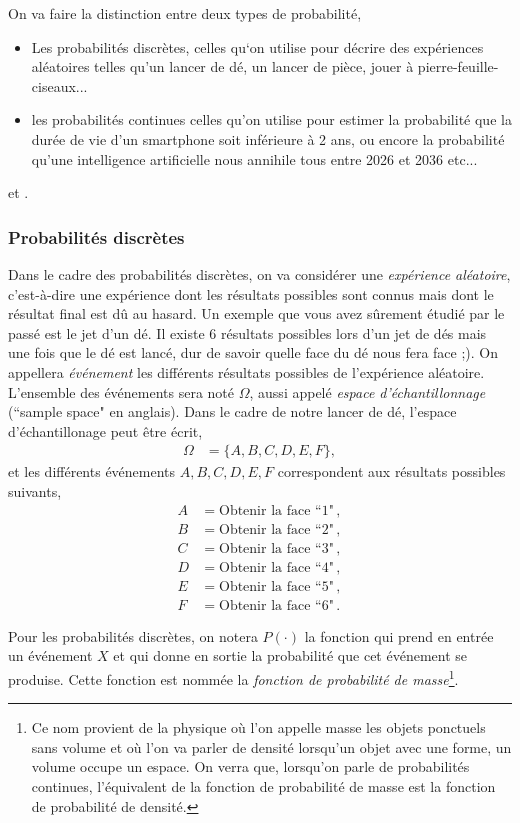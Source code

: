 \documentclass[titlepage]{article}
\theoremstyle{cleanremark}
\begin{document}
On va faire la distinction entre deux types de probabilité,
\begin{itemize}
    \item Les probabilités discrètes, celles qu`on utilise pour décrire des expériences aléatoires telles qu'un lancer de dé, un lancer de pièce, jouer à pierre-feuille-ciseaux...
    \item les probabilités continues celles qu'on utilise pour estimer la probabilité que la durée de vie d'un smartphone soit inférieure à 2 ans, ou encore la probabilité qu'une intelligence artificielle nous annihile tous entre 2026 et 2036 etc...
\end{itemize}  et . 




\subsubsection{Probabilités discrètes}
Dans le cadre des probabilités discrètes, on va considérer une \textit{expérience aléatoire}, c'est-à-dire une expérience dont les résultats possibles sont connus mais dont le résultat final est dû au hasard. Un exemple que vous avez sûrement étudié par le passé est le jet d'un dé. 
Il existe 6 résultats possibles lors d'un jet de dés mais une fois que le dé est lancé, dur de savoir quelle face du dé nous fera face ;).
On appellera \textit{événement} les différents résultats possibles de l'expérience aléatoire. L'ensemble des événements sera noté $\Omega$, aussi appelé \textit{espace d'échantillonnage} (``sample space" en anglais). Dans le cadre de notre lancer de dé, l'espace d'échantillonage peut être écrit,
\begin{align}
    \Omega &= \{A, B, C, D, E, F\},
\end{align}
et les différents événements $A,B,C,D,E,F$ correspondent aux résultats possibles suivants, 
\begin{align}
    A &= \text{Obtenir la face ``1"} \, ,
    \\
    B &= \text{Obtenir la face ``2"}\, ,
    \\
    C &= \text{Obtenir la face ``3"}\, ,
    \\
    D &= \text{Obtenir la face ``4"}\, ,
    \\
    E &= \text{Obtenir la face ``5"}\, ,
    \\
    F &= \text{Obtenir la face ``6"}\, .
\end{align}

Pour les probabilités discrètes, on notera $P(\cdot)$ la fonction qui prend en entrée un événement $X$ et qui donne en sortie la probabilité que cet événement se produise. Cette fonction est nommée la \textit{fonction de probabilité de masse}\footnote{Ce nom provient de la physique où l'on appelle masse les objets ponctuels sans volume et où l'on va parler de densité lorsqu'un objet avec une forme, un volume occupe un espace. On verra que, lorsqu'on parle de probabilités continues, l'équivalent de la fonction de probabilité de masse est la fonction de probabilité de densité.}. 
\end{document}
